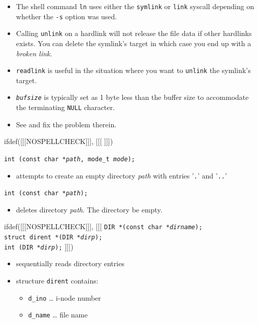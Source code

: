 \begin{itemize}
\item The shell command \texttt{ln} uses either the \texttt{symlink} or
\texttt{link} syscall depending on whether the \texttt{-s} option was used.
\item Calling \texttt{unlink} on a hardlink will not release the file data if
other hardlinks exists. You can delete the symlink's target in which case you
end up with a \emph{broken link}.
\item \texttt{readlink} is useful in the situation where you want to \texttt{unlink}
the symlink's target.
\item \emph{\texttt{bufsize}} is typically set as 1 byte less than the buffer
size to accommodate the terminating \texttt{NULL} character.
\item See  and fix the problem therein.
\end{itemize}


ifdef([[[NOSPELLCHECK]]], [[[
]]])

\begin{slide}
\texttt{int (const char *\emph{path}, mode\_t \emph{mode});}
\begin{itemize}
\item attempts to create an empty directory \emph{path} with entries
'\texttt{.}' and '\texttt{..}'
\end{itemize}
\texttt{int (const char *\emph{path});}
\begin{itemize}
\item deletes directory \emph{path}.  The directory  be empty.
\end{itemize}
ifdef([[[NOSPELLCHECK]]], [[[
\texttt{DIR *(const char *\emph{dirname});}\\
\texttt{struct dirent *(DIR *\emph{dirp});}\\
\texttt{int (DIR *\emph{dirp});}
]]])
\begin{itemize}
\item sequentially reads directory entries
\item structure \texttt{dirent} contains:
    \begin{itemize}
    \item \texttt{d\_ino} \dots{} i-node number
    \item \texttt{d\_name} \dots{} file name
    \end{itemize}
\end{itemize}
\end{slide}


